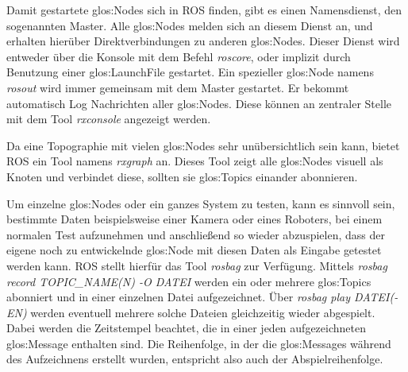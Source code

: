 Damit gestartete \glspl{glos:Node} sich in \gls{ROS} finden, gibt es einen Namensdienst, den sogenannten Master. Alle \glspl{glos:Node} melden sich an diesem Dienst an, und erhalten hierüber Direktverbindungen zu anderen \glspl{glos:Node}. Dieser Dienst wird entweder über die Konsole mit dem Befehl \emph{roscore}, oder implizit durch Benutzung einer \gls{glos:LaunchFile} gestartet. Ein spezieller \gls{glos:Node} namens \emph{rosout} wird immer gemeinsam mit dem Master gestartet. Er bekommt automatisch Log Nachrichten aller \glspl{glos:Node}. Diese können an zentraler Stelle mit dem Tool \emph{rxconsole} angezeigt werden.

Da eine Topographie mit vielen \glspl{glos:Node} sehr unübersichtlich sein kann, bietet \gls{ROS} ein Tool namens \emph{rxgraph} an. Dieses Tool zeigt alle \glspl{glos:Node} visuell als Knoten und verbindet diese, sollten sie \glspl{glos:Topic} einander abonnieren.

Um einzelne \glspl{glos:Node} oder ein ganzes System zu testen, kann es sinnvoll sein, bestimmte Daten beispielsweise einer Kamera oder eines Roboters, bei einem normalen Test aufzunehmen und anschließend so wieder abzuspielen, dass der eigene noch zu entwickelnde \gls{glos:Node} mit diesen Daten als Eingabe getestet werden kann. \gls{ROS} stellt hierfür das Tool \emph{rosbag} zur Verfügung. Mittels \emph{rosbag record TOPIC\_NAME(N) -O DATEI} werden ein oder mehrere \glspl{glos:Topic} abonniert und in einer einzelnen Datei aufgezeichnet. Über \emph{rosbag play DATEI(-EN)} werden eventuell mehrere solche Dateien gleichzeitig wieder abgespielt. Dabei werden die Zeitstempel beachtet, die in einer jeden aufgezeichneten \gls{glos:Message} enthalten sind. Die Reihenfolge, in der die \glspl{glos:Message} während des Aufzeichnens erstellt wurden, entspricht also auch der Abspielreihenfolge.


